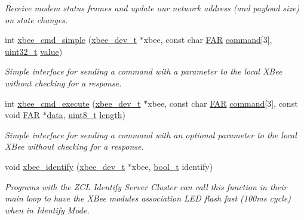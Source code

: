 \begin{DoxyCompactItemize}
\begin{DoxyCompactList}\small\item\em Receive modem status frames and update our network address (and payload size) on state changes. \end{DoxyCompactList}\item 
int \hyperlink{group__xbee__atcmd_ga6b157fe048c0082253056a7bda0ba9bb}{xbee\+\_\+cmd\+\_\+simple} (\hyperlink{structxbee__dev__t}{xbee\+\_\+dev\+\_\+t} $\ast$xbee, const char \hyperlink{group__hal_gaef060b3456fdcc093a7210a762d5f2ed}{F\+AR} \hyperlink{group__xbee__atcmd_ga1a5aaa930940857f68f245eeb89506b5}{command}\mbox{[}3\mbox{]}, \hyperlink{group__hal__dos_ga09a1e304d66d35dd47daffee9731edaa}{uint32\+\_\+t} \hyperlink{group__zcl_ga1ed5b151a90f7e99af8cca2e6875ddf4}{value})
\begin{DoxyCompactList}\small\item\em Simple interface for sending a command with a parameter to the local X\+Bee without checking for a response. \end{DoxyCompactList}\item 
int \hyperlink{group__xbee__atcmd_ga19d16fbaf1da1cc581fbedcb36f7263f}{xbee\+\_\+cmd\+\_\+execute} (\hyperlink{structxbee__dev__t}{xbee\+\_\+dev\+\_\+t} $\ast$xbee, const char \hyperlink{group__hal_gaef060b3456fdcc093a7210a762d5f2ed}{F\+AR} \hyperlink{group__xbee__atcmd_ga1a5aaa930940857f68f245eeb89506b5}{command}\mbox{[}3\mbox{]}, const void \hyperlink{group__hal_gaef060b3456fdcc093a7210a762d5f2ed}{F\+AR} $\ast$\hyperlink{group__xbee__io_gac5955aa1e44ff234e6d78a19cf68f25c}{data}, \hyperlink{group__hal__dos_gae1affc9ca37cfb624959c866a73f83c2}{uint8\+\_\+t} \hyperlink{group__zdo_gab2b3adeb2a67e656ff030b56727fd0ac}{length})
\begin{DoxyCompactList}\small\item\em Simple interface for sending a command with an optional parameter to the local X\+Bee without checking for a response. \end{DoxyCompactList}\item 
void \hyperlink{group__xbee__atcmd_ga42768d8f8aa841ed4f42396cff2815aa}{xbee\+\_\+identify} (\hyperlink{structxbee__dev__t}{xbee\+\_\+dev\+\_\+t} $\ast$xbee, \hyperlink{group__hal__dos_ga04dd5074964518403bf944f2b240a5f8}{bool\+\_\+t} identify)
\begin{DoxyCompactList}\small\item\em Programs with the Z\+CL Identify Server Cluster can call this function in their main loop to have the X\+Bee module\textquotesingle{}s association L\+ED flash fast (100ms cycle) when in Identify Mode. \end{DoxyCompactList}\item 

\end{DoxyCompactItemize}

